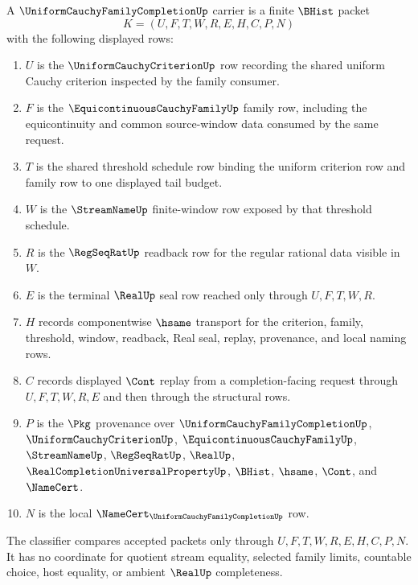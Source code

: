 \begin{definition}
\label{def:uniform-cauchy-family-completion-carrier}
A $\UniformCauchyFamilyCompletionUp$ carrier is a finite $\BHist$ packet
$$
K=(U,F,T,W,R,E,H,C,P,N)
$$
with the following displayed rows:
\begin{enumerate}
\item $U$ is the $\UniformCauchyCriterionUp$ row recording the shared uniform Cauchy criterion inspected by the family consumer.
\item $F$ is the $\EquicontinuousCauchyFamilyUp$ family row, including the equicontinuity and common source-window data consumed by the same request.
\item $T$ is the shared threshold schedule row binding the uniform criterion row and family row to one displayed tail budget.
\item $W$ is the $\StreamNameUp$ finite-window row exposed by that threshold schedule.
\item $R$ is the $\RegSeqRatUp$ readback row for the regular rational data visible in $W$.
\item $E$ is the terminal $\RealUp$ seal row reached only through $U,F,T,W,R$.
\item $H$ records componentwise $\hsame$ transport for the criterion, family, threshold, window, readback, Real seal, replay, provenance, and local naming rows.
\item $C$ records displayed $\Cont$ replay from a completion-facing request through $U,F,T,W,R,E$ and then through the structural rows.
\item $P$ is the $\Pkg$ provenance over $\UniformCauchyFamilyCompletionUp$, $\UniformCauchyCriterionUp$, $\EquicontinuousCauchyFamilyUp$, $\StreamNameUp$, $\RegSeqRatUp$, $\RealUp$, $\RealCompletionUniversalPropertyUp$, $\BHist$, $\hsame$, $\Cont$, and $\NameCert$.
\item $N$ is the local $\NameCert_{\UniformCauchyFamilyCompletionUp}$ row.
\end{enumerate}
The classifier compares accepted packets only through $U,F,T,W,R,E,H,C,P,N$. It has no coordinate for quotient stream equality, selected family limits, countable choice, host equality, or ambient $\RealUp$ completeness.
\end{definition}


